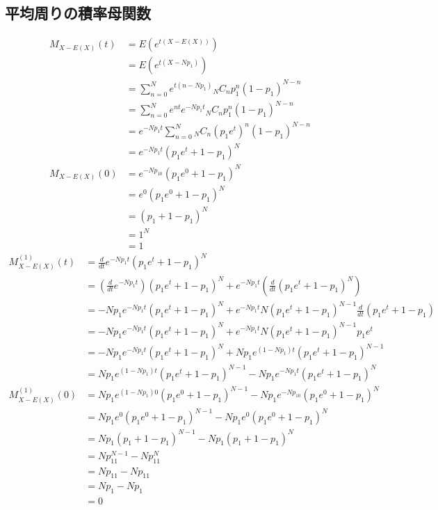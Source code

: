 \documentclass[dvipdfmx]{jsarticle}
\begin{document}
 \subsection{平均周りの積率母関数}
 \begin{align}
  M_{X-E\left(X\right)}\left(t\right)&=E\left(e^{t\left(X-E\left(X\right)\right)}\right)\nonumber\\
  &=E\left(e^{t\left(X-Np_1\right)}\right)\nonumber\\
  &=\sum_{n=0}^Ne^{t\left(n-Np_1\right)}{}_NC_np_1^n\left(1-p_1\right)^{N-n}\nonumber\\
  &=\sum_{n=0}^Ne^{nt}e^{-Np_1t}{}_NC_np_1^n\left(1-p_1\right)^{N-n}\nonumber\\
  &=e^{-Np_1t}\sum_{n=0}^N{}_NC_n\left(p_1e^t\right)^n\left(1-p_1\right)^{N-n}\nonumber\\
  &=e^{-Np_1t}\left(p_1e^t+1-p_1\right)^N\\
  M_{X-E\left(X\right)}\left(0\right)&=e^{-Np_10}\left(p_1e^0+1-p_1\right)^N\nonumber\\
  &=e^0\left(p_1e^0+1-p_1\right)^N\nonumber\\
  &=\left(p_1+1-p_1\right)^N\nonumber\\
  &=1^N\nonumber\\
  &=1
 \end{align}
 \begin{align}
  M_{X-E\left(X\right)}^{\left(1\right)}\left(t\right)&=\frac{d}{dt}e^{-Np_1t}\left(p_1e^t+1-p_1\right)^N\nonumber\\
  &=\left(\frac{d}{dt}e^{-Np_1t}\right)\left(p_1e^t+1-p_1\right)^N+e^{-Np_1t}\left(\frac{d}{dt}\left(p_1e^t+1-p_1\right)^N\right)\nonumber\\
  &=-Np_1e^{-Np_1t}\left(p_1e^t+1-p_1\right)^N+e^{-Np_1t}N\left(p_1e^t+1-p_1\right)^{N-1}\frac{d}{dt}\left(p_1e^t+1-p_1\right)\nonumber\\
  &=-Np_1e^{-Np_1t}\left(p_1e^t+1-p_1\right)^N+e^{-Np_1t}N\left(p_1e^t+1-p_1\right)^{N-1}p_1e^t\nonumber\\
  &=-Np_1e^{-Np_1t}\left(p_1e^t+1-p_1\right)^N+Np_1e^{\left(1-Np_1\right)t}\left(p_1e^t+1-p_1\right)^{N-1}\nonumber\\
  &=Np_1e^{\left(1-Np_1\right)t}\left(p_1e^t+1-p_1\right)^{N-1}-Np_1e^{-Np_1t}\left(p_1e^t+1-p_1\right)^N\\
  M_{X-E\left(X\right)}^{\left(1\right)}\left(0\right)&=Np_1e^{\left(1-Np_1\right)0}\left(p_1e^0+1-p_1\right)^{N-1}-Np_1e^{-Np_10}\left(p_1e^0+1-p_1\right)^N\nonumber\\
  &=Np_1e^0\left(p_1e^0+1-p_1\right)^{N-1}-Np_1e^0\left(p_1e^0+1-p_1\right)^N\nonumber\\
  &=Np_1\left(p_1+1-p_1\right)^{N-1}-Np_1\left(p_1+1-p_1\right)^N\nonumber\\
  &=Np_11^{N-1}-Np_11^N\nonumber\\
  &=Np_11-Np_11\nonumber\\
  &=Np_1-Np_1\nonumber\\
  &=0
 \end{align}
\end{document}
